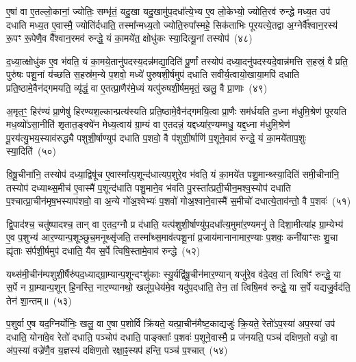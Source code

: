 ए॒षां वा ए॒तल्लो॒कानां॒ ज्योतिः॒ सम्भृ॑तं॒ यदु॒खा यदु॒खामु॑प॒दधा᳚त्ये॒भ्य ए॒व लो॒केभ्यो॒ ज्योति॒रव॑ रुन्द्धे मध्य॒त उप॑ दधाति मध्य॒त ए॒वास्मै॒ ज्योति॑र्दधाति॒ तस्मा᳚न्मध्य॒तो ज्योति॒रुपा᳚स्महे॒ सिक॑ताभिः पूरयत्ये॒तद्वा अ॒ग्नेर्वै᳚श्वान॒रस्य॑ रू॒पꣳ रू॒पेणै॒व वै᳚श्वान॒रमव॑ रुन्द्धे॒ यं का॒मये॑त॒ क्षोधु॑कः स्या॒दित्यू॒नां तस्योप॑~(४८)

द॒ध्या॒त्क्षोधु॑क ए॒व भ॑वति॒ यं का॒मये॒तानु॑पदस्य॒दन्न॑मद्या॒दिति॑ पू॒र्णां तस्योप॑ दध्या॒दनु॑पदस्यदे॒वान्न॑मत्ति स॒हस्रं॒ वै प्रति॒ पुरु॑षः पशू॒नां य॑च्छति स॒हस्र॑म॒न्ये प॒शवो॒ मध्ये॑ पुरुषशी॒र्\mbox{}षमुप॑ दधाति सवीर्य॒त्वायो॒खाया॒मपि॑ दधाति प्रति॒ष्ठामे॒वैन॑द्गमयति॒ व्यृ॑द्धं॒ वा ए॒तत्प्रा॒णैर॑मे॒ध्यं यत्पु॑रुषशी॒र्\mbox{}षम॒मृतं॒ खलु॒ वै प्रा॒णाः~(४९)

अ॒मृत॒ꣳ॒ हिर॑ण्यं प्रा॒णेषु॑ हिरण्यश॒ल्कान्प्रत्य॑स्यति प्रति॒ष्ठामे॒वैन॑द्गमयि॒त्वा प्रा॒णैः सम॑र्धयति द॒ध्ना म॑धुमि॒श्रेण॑ पूरयति मध॒व्यो॑\-ऽसा॒नीति॑ शृतात॒ङ्क्ये॑न मेध्य॒त्वाय॑ ग्रा॒म्यं वा ए॒तदन्नं॒ यद्दध्या॑र॒ण्यम्मधु॒ यद्द॒ध्ना म॑धुमि॒श्रेण॑ पू॒रय॑त्यु॒भय॒स्याव॑रुद्ध्यै पशुशी॒र्\mbox{}षाण्युप॑ दधाति प॒शवो॒ वै प॑शुशी॒र्\mbox{}षाणि॑ प॒शूने॒वाव॑ रुन्द्धे॒ यं का॒मये॑ताप॒शुः स्या॒दिति॑~(५०)

वि॒षू॒चीना॑नि॒ तस्योप॑ दध्या॒द्विषू॑च ए॒वास्मा᳚त्प॒शून्द॑धात्यप॒शुरे॒व भ॑वति॒ यं का॒मये॑त पशु॒मान्थ्स्या॒दिति॑ समी॒चीना॑नि॒ तस्योप॑ दध्याथ्स॒मीच॑ ए॒वास्मै॑ प॒शून्द॑धाति पशु॒माने॒व भ॑वति पु॒रस्ता᳚त्प्रती॒चीन॒मश्व॒स्योप॑ दधाति प॒श्चात्प्रा॒चीन॑मृष॒भस्याप॑शवो॒ वा अ॒न्ये गो॑अ॒श्वेभ्यः॑ प॒शवो॑ गोअ॒श्वाने॒वास्मै॑ स॒मीचो॑ दधात्ये॒ताव॑न्तो॒ वै प॒शवः॑~(५१)

द्वि॒पाद॑श्च॒ चतु॑ष्पादश्च॒ तान् वा ए॒तद॒ग्नौ प्र द॑धाति॒ यत्प॑शुशी॒र्\mbox{}षाण्यु॑प॒दधा᳚त्य॒मुमा॑र॒ण्यमनु॑ ते दिशा॒मीत्या॑ह ग्रा॒म्येभ्य॑ ए॒व प॒शुभ्य॑ आर॒ण्यान्प॒शूञ्छुच॒मनूथ्सृ॑जति॒ तस्मा᳚थ्स॒माव॑त्पशू॒नां प्र॒जाय॑मानानामार॒ण्याः प॒शवः॒ कनी॑याꣳसः शु॒चा ह्यृ॑ताः स॑र्पशी॒र्\mbox{}षमुप॑ दधाति॒ यैव स॒र्पे त्विषि॒स्तामे॒वाव॑ रुन्द्धे~(५२)

यथ्स॑मी॒चीन॑म्पशुशी॒र्\mbox{}षैरु॑पद॒ध्याद्ग्रा॒म्यान्प॒शून्दꣳशु॑काः स्यु॒र्यद्वि॑षू॒चीन॑मार॒ण्यान् यजु॑रे॒व व॑दे॒दव॒ तां त्विषिꣳ॑ रुन्द्धे॒ या स॒र्पे न ग्रा॒म्यान्प॒शून् हि॒नस्ति॒ नार॒ण्यानथो॒ खलू॑प॒धेय॑मे॒व यदु॑प॒दधा॑ति॒ तेन॒ तां त्विषि॒मव॑ रुन्द्धे॒ या स॒र्पे यद्यजु॒र्वद॑ति॒ तेन॑ शा॒न्तम्॥~(५३)

{\anuvakamend[{ऊ॒नान्तस्योप॑ प्रा॒णाः स्या॒दिति॒ वै प॒शवो॑ रुन्धे॒ चतु॑श्चत्वारिꣳशच्च}]}%

प॒शुर्वा ए॒ष यद॒ग्निर्योनिः॒ खलु॒ वा ए॒षा प॒शोर्वि क्रि॑यते॒ यत्प्रा॒चीन॑मैष्ट॒काद्यजुः॑ क्रि॒यते॒ रेतो॑\-ऽप॒स्या॑ अप॒स्या॑ उप॑ दधाति॒ योना॑वे॒व रेतो॑ दधाति॒ पञ्चोप॑ दधाति॒ पाङ्क्ताः᳚ प॒शवः॑ प॒शूने॒वास्मै॒ प्र ज॑नयति॒ पञ्च॑ दक्षिण॒तो वज्रो॒ वा अ॑प॒स्या॑ वज्रे॑णै॒व य॒ज्ञस्य॑ दक्षिण॒तो रक्षा॒ꣴ॒स्यप॑ हन्ति॒ पञ्च॑ प॒श्चात्~(५४)

